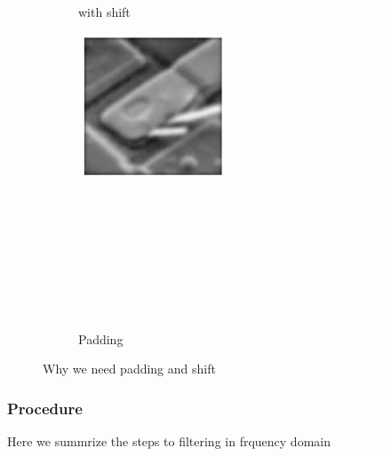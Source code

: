 \documentclass[
	12pt, %
]{style/fphw}
\begin{document}
\begin{figure}[H]
\begin{subfigure}[b]{0.3\textwidth}
         \caption{with shift}
         \label{Q5_2_lowpass_30_error.tif}
     \end{subfigure}
     \hfill
     \begin{subfigure}[b]{0.3\textwidth}
         \centering
         \includegraphics[width=\textwidth]{chart/padding.png}
         \caption{Padding}
         \label{padding.png}
     \end{subfigure}
        \caption{Why we need padding and shift}
        \label{padding}
\end{figure}

\subsubsection*{Procedure}
Here we summrize the steps to filtering in frquency domain
\end{document}
